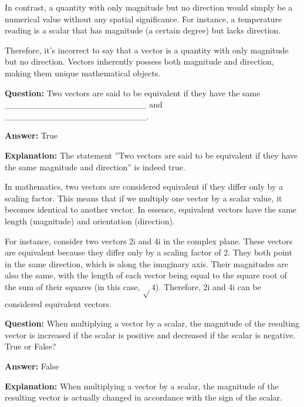 \documentclass{article}
\begin{document}
In contrast, a quantity with only magnitude but no direction would simply be a numerical value without any spatial significance. For instance, a temperature reading is a scalar that has magnitude (a certain degree) but lacks direction.

Therefore, it's incorrect to say that a vector is a quantity with only magnitude but no direction. Vectors inherently possess both magnitude and direction, making them unique mathematical objects.
                
                \vspace{0.5cm} 
        
            
                \textbf {Question:} Two vectors are said to be equivalent if they have the same \_\_\_\_\_\_\_\_\_\_\_\_\_\_\_\_\_\_\_\_\_\_\_ and \_\_\_\_\_\_\_\_\_\_\_\_\_\_\_\_\_\_\_\_\_\_\_.
                
                \textbf{Answer:} True

                \textbf{Explanation:} The statement ''Two vectors are said to be equivalent if they have the same magnitude and direction'' is indeed true.

In mathematics, two vectors are considered equivalent if they differ only by a scaling factor. This means that if we multiply one vector by a scalar value, it becomes identical to another vector. In essence, equivalent vectors have the same length (magnitude) and orientation (direction). 

For instance, consider two vectors 2i and 4i in the complex plane. These vectors are equivalent because they differ only by a scaling factor of 2. They both point in the same direction, which is along the imaginary axis. Their magnitudes are also the same, with the length of each vector being equal to the square root of the sum of their squares (in this case, \ensuremath{\sqrt{}}4). Therefore, 2i and 4i can be considered equivalent vectors.
                
                \vspace{0.5cm} 
        
            
                \textbf {Question:} When multiplying a vector by a scalar, the magnitude of the resulting vector is increased if the scalar is positive and decreased if the scalar is negative. True or False?
                
                \textbf{Answer:} False

                \textbf{Explanation:} When multiplying a vector by a scalar, the magnitude of the resulting vector is actually changed in accordance with the sign of the scalar. 
\end{document}
